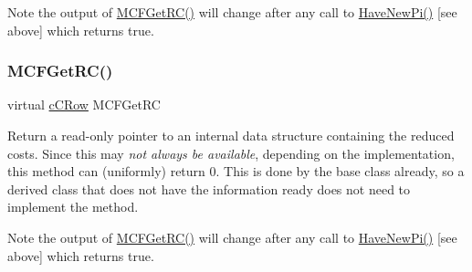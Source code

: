 \begin{DoxyNote}{Note}
the output of \mbox{\hyperlink{class_m_c_f_class_af027cee8179a876a4879c73820c380d1}{M\+C\+F\+Get\+R\+C()}} will change after any call to \mbox{\hyperlink{class_m_c_f_class_a87b2b6516a7874ac55145312bd2d55bb}{Have\+New\+Pi()}} \mbox{[}see above\mbox{]} which returns true. 
\end{DoxyNote}
\mbox{\label{class_s_p_tree_af027cee8179a876a4879c73820c380d1}} 
\subsubsection{\texorpdfstring{M\+C\+F\+Get\+R\+C()}{MCFGetRC()}\hspace{0.1cm}{\footnotesize\ttfamily [3/5]}}
{\footnotesize\ttfamily virtual \mbox{\hyperlink{class_m_c_f_class_ab700102e9ba8bb6015be6818d4e99097}{c\+C\+Row}} M\+C\+F\+Get\+RC\hspace{0.3cm}{\ttfamily [inline]}}

Return a read-\/only pointer to an internal data structure containing the reduced costs. Since this may {\itshape not always be available}, depending on the implementation, this method can (uniformly) return 0. This is done by the base class already, so a derived class that does not have the information ready does not need to implement the method.

\begin{DoxyNote}{Note}
the output of \mbox{\hyperlink{class_m_c_f_class_af027cee8179a876a4879c73820c380d1}{M\+C\+F\+Get\+R\+C()}} will change after any call to \mbox{\hyperlink{class_m_c_f_class_a87b2b6516a7874ac55145312bd2d55bb}{Have\+New\+Pi()}} \mbox{[}see above\mbox{]} which returns true. 
\end{DoxyNote}
\mbox{\label{class_s_p_tree_aa7cb14464eba4814fef17efc9871b1de}} 
